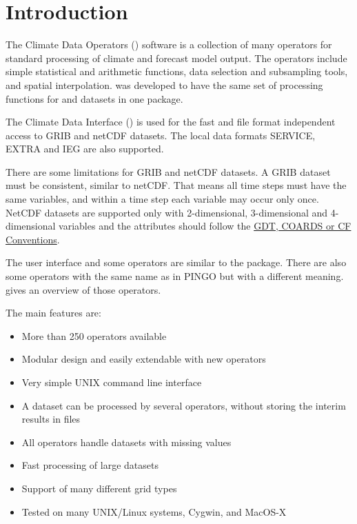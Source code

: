 \chapter{Introduction}

The Climate Data Operators ({\CDO}) software is a collection of many operators
for standard processing of climate and forecast model output.
The operators include simple statistical and arithmetic functions, data selection
and subsampling tools, and spatial interpolation.
{\CDO} was developed to have the same set of processing functions for  and 
datasets in one package.

The Climate Data Interface () is used for the fast and file format
independent access to GRIB and netCDF datasets.
The local data formats SERVICE, EXTRA and IEG are also supported.

There are some limitations for GRIB and netCDF datasets.
A GRIB dataset must be consistent, similar to netCDF.
That means all time steps must have the same variables, and
within a time step each variable may occur only once.
NetCDF datasets are supported only with 2-dimensional, 3-dimensional and 4-dimensional
variables and the attributes should follow the
\href{http://ftp.unidata.ucar.edu/software/netcdf/docs/conventions.html}
     {GDT, COARDS or CF Conventions}.

The user interface and some operators are similar to the  package.
There are also some operators with the same name as in PINGO but with a 
different meaning.  gives an overview of 
those operators.

The main {\CDO} features are:
\begin{itemize}
\item More than 250 operators available
\item Modular design and easily extendable with new operators
\item Very simple UNIX command line interface
\item A dataset can be processed by several operators,
      without storing the interim results in files %
\item All operators handle datasets with missing values
\item Fast processing of large datasets
\item Support of many different grid types
\item Tested on many UNIX/Linux systems, Cygwin, and MacOS-X
\end{itemize}












